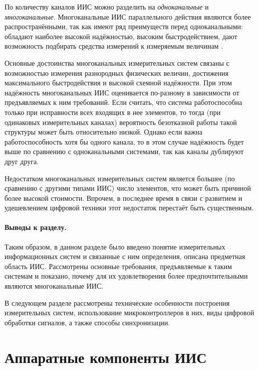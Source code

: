 \documentclass[a4paper, 14pt, titlepage]{extarticle}
\newcommand{\term}[1]{\emph{#1}}
\let\oldsection\section
\renewcommand{\section}{\newpage\oldsection}
\begin{document}
  По количеству каналов ИИС можно разделить на \term{одноканальные} и \term{многоканальные}. Многоканальные ИИС
  параллельного действия являются более распространёнными, так как имеют ряд преимуществ перед
  одноканальными: обладают наиболее высокой надёжностью, высоким быстродействием, дают возможность
  подбирать средства измерений к измеряемым величинам
  \cite[с.~171]{rannev-iis}.

  Основные достоинства многоканальных измерительных систем связаны с возможностью измерения
  разнородных физических величин, достижения
  максимального быстродействия и высокой схемной надёжности. При этом надёжность многоканальных ИИС
  оценивается по-разному в зависимости от предъявляемых к ним требований. Если считать, что система
  работоспособна только при исправности всех входящих в нее элементов, то тогда (при одинаковых
  измерительных каналах) вероятность безотказной работы такой структуры может быть относительно
  низкой. Однако если важна работоспособность хотя бы одного канала, то в этом случае надёжность
  будет выше по сравнению с одноканальными системами, так как каналы дублируют друг друга.

  Недостатком многоканальных измерительных систем является большее (по сравнению с
  другими типами ИИС) число элементов, что может быть причиной более высокой стоимости. Впрочем, в
  последнее время в связи с развитием и удешевлением цифровой техники \cite{rathore-digital} этот недостаток
  перестаёт быть существенным.



  \paragraph{Выводы к разделу.}
  Таким образом, в данном разделе было введено понятие измерительных информационных
  систем и связанные с ним определения, описана предметная область ИИС. Рассмотрены
  основные требования, предъявляемые к таким системам и показано, почему для их удовлетворения более
  предпочтительными являются многоканальные ИИС.

  В следующем разделе рассмотрены технические особенности построения измерительных систем,
  использование микроконтроллеров в них, виды цифровой обработки сигналов, а также способы
  синхронизации.

  \section{Аппаратные компоненты ИИС}\label{sec:hardware}
\end{document}
